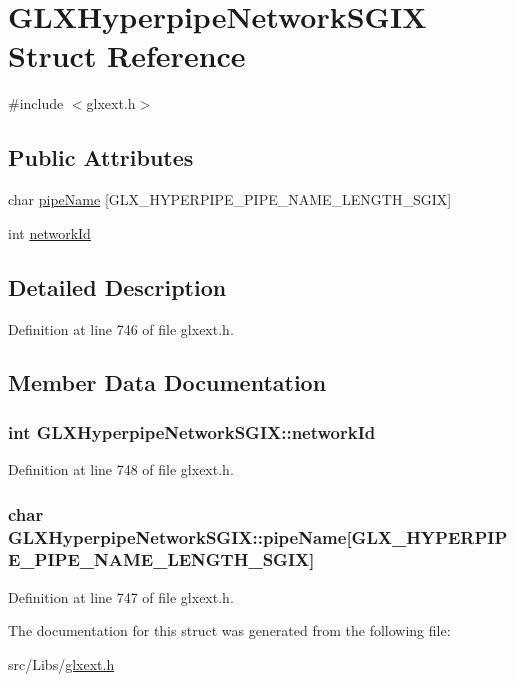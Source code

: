 \hypertarget{struct_g_l_x_hyperpipe_network_s_g_i_x}{
\section{GLXHyperpipeNetworkSGIX Struct Reference}
\label{struct_g_l_x_hyperpipe_network_s_g_i_x}
}


{\ttfamily \#include $<$glxext.h$>$}

\subsection*{Public Attributes}
\begin{DoxyCompactItemize}
\item 
char \hyperlink{struct_g_l_x_hyperpipe_network_s_g_i_x_a6338b9717fa895aec16b932f2ef693ed}{pipeName} \mbox{[}GLX\_\-HYPERPIPE\_\-PIPE\_\-NAME\_\-LENGTH\_\-SGIX\mbox{]}
\item 
int \hyperlink{struct_g_l_x_hyperpipe_network_s_g_i_x_a81393053988b32fadb0b21615024add1}{networkId}
\end{DoxyCompactItemize}


\subsection{Detailed Description}


Definition at line 746 of file glxext.h.



\subsection{Member Data Documentation}
\hypertarget{struct_g_l_x_hyperpipe_network_s_g_i_x_a81393053988b32fadb0b21615024add1}{
\subsubsection[{networkId}]{\setlength{\rightskip}{0pt plus 5cm}int {\bf GLXHyperpipeNetworkSGIX::networkId}}}
\label{struct_g_l_x_hyperpipe_network_s_g_i_x_a81393053988b32fadb0b21615024add1}


Definition at line 748 of file glxext.h.

\hypertarget{struct_g_l_x_hyperpipe_network_s_g_i_x_a6338b9717fa895aec16b932f2ef693ed}{
\subsubsection[{pipeName}]{\setlength{\rightskip}{0pt plus 5cm}char {\bf GLXHyperpipeNetworkSGIX::pipeName}\mbox{[}GLX\_\-HYPERPIPE\_\-PIPE\_\-NAME\_\-LENGTH\_\-SGIX\mbox{]}}}
\label{struct_g_l_x_hyperpipe_network_s_g_i_x_a6338b9717fa895aec16b932f2ef693ed}


Definition at line 747 of file glxext.h.



The documentation for this struct was generated from the following file:\begin{DoxyCompactItemize}
\item 
src/Libs/\hyperlink{glxext_8h}{glxext.h}\end{DoxyCompactItemize}
